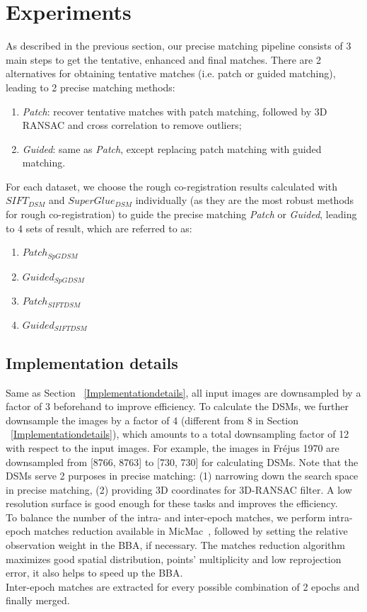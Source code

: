 \section{Experiments}
As described in the previous section, our precise matching pipeline consists of 3 main steps to get the tentative, enhanced and final matches. There are 2 alternatives for obtaining tentative matches (i.e. patch or guided matching), leading to 2 precise matching methods:\\
\begin{enumerate}
	\item \textit{Patch}: recover tentative matches with patch matching, followed by 3D RANSAC and cross correlation to remove outliers;
	\item \textit{Guided}: same as \textit{Patch}, except replacing patch matching with guided matching.
\end{enumerate}
For each dataset, we choose the rough co-registration results calculated with $SIFT_{DSM}$ and $SuperGlue_{DSM}$ individually (as they are the most robust methods for rough co-registration) to guide the precise matching \textit{Patch} or \textit{Guided}, leading to 4 sets of result, which are referred to as:\\
\begin{enumerate}
	\item $Patch_{SpGDSM}$
	\item $Guided_{SpGDSM}$
	\item $Patch_{SIFTDSM}$
	\item $Guided_{SIFTDSM}$
\end{enumerate}

\subsection{Implementation details}
Same as Section ~\ref{Implementationdetails}, all input images are downsampled by a factor of 3 beforehand to improve efficiency. To calculate the DSMs, we further downsample the images by a factor of 4 (different from 8 in Section ~\ref{Implementationdetails}), which amounts to a total downsampling factor of 12 with respect to the input images. For example, the images in Fr{\'e}jus 1970 are downsampled from [8766, 8763] to [730, 730] for calculating DSMs. 
Note that the DSMs serve 2 purposes in precise matching: (1) narrowing down the search space in precise matching, (2) providing 3D coordinates for 3D-RANSAC filter. A low resolution surface is good enough for these tasks and improves the efficiency.\\
To balance the number of the intra- and inter-epoch matches, we perform intra-epoch matches reduction available in MicMac~\cite{marc2016micmac}, followed by setting the relative observation weight in the \ac{BBA}, if necessary. The matches reduction algorithm maximizes good spatial distribution, points' multiplicity and low reprojection error, it also helps to speed up the \ac{BBA}.\\
Inter-epoch matches are extracted {for every possible combination of 2 epochs and finally merged}.\\


